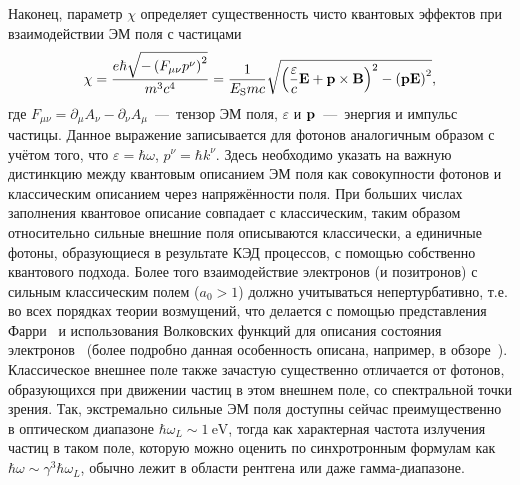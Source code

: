 Наконец, параметр $\chi$ определяет существенность чисто квантовых эффектов при взаимодействии ЭМ поля с частицами
\begin{equation}
    \chi = \frac{e\hbar\sqrt{-\left( F_{\mu\nu}p^\nu \right)^2}}{m^3c^4} = \frac{1}{E_\mathrm{S} mc} \sqrt{{\left( \frac{\varepsilon}{c}\vb{E} + \vb{p}\times\vb{B} \right)}^2 - {\left(\vb{p}\vb{E} \right)}^2} ,
\end{equation}
где $F_{\mu\nu}=\partial_\mu A_\nu - \partial_\nu A_\mu$~---~тензор ЭМ поля, $\varepsilon$ и $\vb{p}$~---~энергия и импульс частицы.
Данное выражение записывается для фотонов аналогичным образом с учётом того, что $\varepsilon=\hbar\omega$, $p^\nu=\hbar k^\nu$.
Здесь необходимо указать на важную дистинкцию между квантовым описанием ЭМ поля как совокупности фотонов и классическим описанием через напряжённости поля.
При больших числах заполнения квантовое описание совпадает с классическим, таким образом относительно сильные внешние поля описываются классически, а единичные фотоны, образующиеся в результате КЭД процессов, с помощью собственно квантового подхода.
Более того взаимодействие электронов (и позитронов) с сильным классическим полем ($a_0 > 1$) должно учитываться непертурбативно, т.е. во всех порядках теории возмущений, что делается с помощью представления Фарри~\cite{furry1951bound} и использования Волковских функций для описания состояния электронов~\cite{wolkow1935klasse} (более подробно данная особенность описана, например, в обзоре~\cite{fedotov2022QED}).
Классическое внешнее поле также зачастую существенно отличается от фотонов, образующихся при движении частиц в этом внешнем поле, со спектральной точки зрения.
Так, экстремально сильные ЭМ поля доступны сейчас преимущественно в оптическом диапазоне $\hbar\omega_L\sim\SI{1}{\electronvolt}$, тогда как характерная частота излучения частиц в таком поле, которую можно оценить по синхротронным формулам как $\hbar\omega\sim\gamma^3\hbar\omega_L$, обычно лежит в области рентгена или даже гамма-диапазоне.

